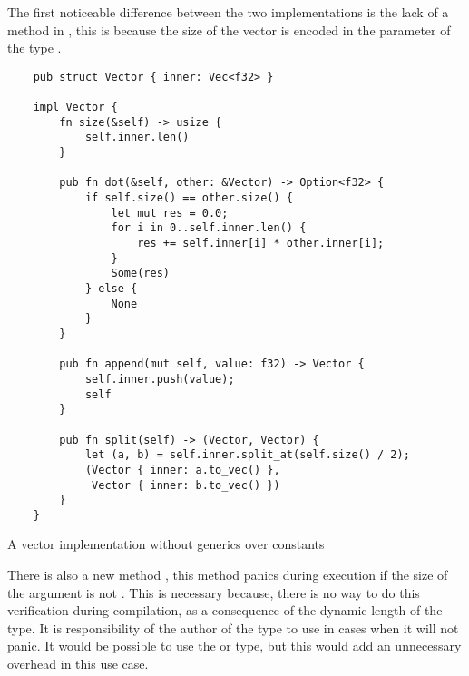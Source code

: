 The first noticeable difference between the two implementations is the lack of
a  method in , this is because the size
of the vector is encoded in the  parameter of the type
. 

\begin{listing}[H]
    \begin{verbatim}
    pub struct Vector { inner: Vec<f32> }

    impl Vector {
        fn size(&self) -> usize {
            self.inner.len()
        }

        pub fn dot(&self, other: &Vector) -> Option<f32> {
            if self.size() == other.size() {
                let mut res = 0.0; 
                for i in 0..self.inner.len() {
                    res += self.inner[i] * other.inner[i];
                }
                Some(res)
            } else {
                None
            }
        }

        pub fn append(mut self, value: f32) -> Vector {
            self.inner.push(value);
            self
        }

        pub fn split(self) -> (Vector, Vector) {
            let (a, b) = self.inner.split_at(self.size() / 2);
            (Vector { inner: a.to_vec() }, 
             Vector { inner: b.to_vec() })
        }
    }
    \end{verbatim}
    \caption{A vector implementation without generics over constants}
  \label{lst:vector_vanilla}
\end{listing}

There is also a new method , this method panics
during execution if the size of the  argument is not .
This is necessary because, there is no way to do this verification during
compilation, as a consequence of the dynamic length of the  type.
It is responsibility of the author of the  type to use
 in cases when it will not panic. It would be
possible to use the  or  type, but this would add
an unnecessary overhead in this use case.

